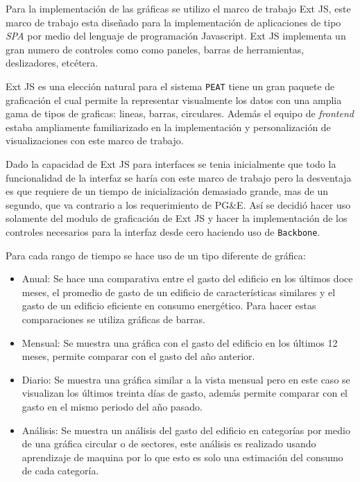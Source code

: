 Para la implementación de las gráficas se utilizo el marco de trabajo
Ext JS, este marco de trabajo esta diseñado para la implementación
de aplicaciones de tipo \textit{SPA} por medio del lenguaje de programación
Javascript. Ext JS implementa un gran numero de controles como
como paneles, barras de herramientas, deslizadores, etcétera.

Ext JS es una elección natural para el sistema \texttt{PEAT} tiene un gran
paquete de graficación el cual permite la representar visualmente los datos con una
amplia gama de tipos de graficas: lineas, barras, circulares. Además el equipo
de \textit{frontend} estaba ampliamente familiarizado en la implementación y
personalización de visualizaciones con este marco de trabajo.

Dado la capacidad de Ext JS para interfaces se tenia inicialmente
que todo la funcionalidad de la interfaz se haría con este marco de trabajo pero
la desventaja es que requiere de un tiempo de inicialización demasiado grande,
mas de un segundo, que va contrario a los requerimiento de PG\&E.
Así se decidió hacer uso solamente del modulo de graficación de Ext JS y
hacer la implementación de los controles necesarios para la interfaz desde cero
haciendo uso de \texttt{Backbone}.

Para cada rango de tiempo se hace uso de un tipo diferente de gráfica:
\begin{itemize}
\item Anual: Se hace una comparativa entre el gasto del edificio en los últimos doce
  meses, el promedio de gasto de un edificio de características similares y
  el gasto de un edificio eficiente en consumo energético. Para hacer estas
  comparaciones se utiliza gráficas de barras.
\item Mensual: Se muestra una gráfica con el gasto del edificio en los últimos 12
  meses, permite comparar con el gasto del año anterior.
\item Diario: Se muestra una gráfica similar a la vista mensual pero en este caso
  se visualizan los últimos treinta días de gasto, además permite comparar
  con el gasto en el mismo periodo del año pasado.
\item Análisis: Se muestra un análisis del gasto del edificio en categorías
  por medio de una gráfica circular o de sectores, este análisis es realizado
  usando aprendizaje de maquina por lo que esto es solo una estimación del consumo
  de cada categoría.
\end{itemize}

